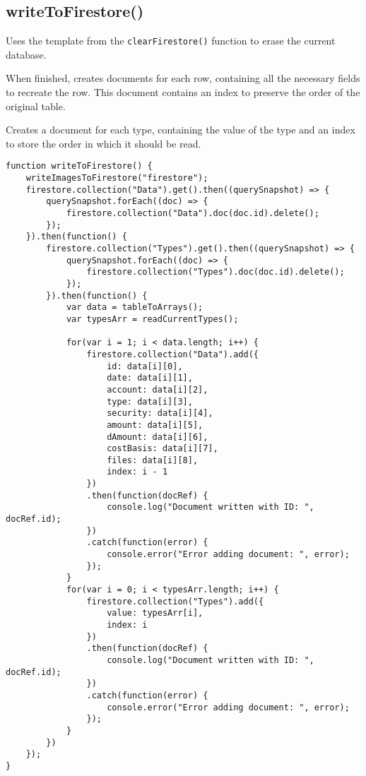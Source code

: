 \documentclass[letterpaper]{article}
\begin{document}
\subsection{writeToFirestore()}

Uses the template from the \lstinline{clearFirestore()} function to erase the current database.

When finished, creates documents for each row, containing all the necessary fields to recreate the row.
This document contains an index to preserve the order of the original table.

Creates a document for each type, containing the value of the type and an index to store the order in which it should be read.

\begin{lstlisting}[firstnumber=76]
function writeToFirestore() {
    writeImagesToFirestore("firestore");
    firestore.collection("Data").get().then((querySnapshot) => {
        querySnapshot.forEach((doc) => {
            firestore.collection("Data").doc(doc.id).delete();
        });
    }).then(function() {
        firestore.collection("Types").get().then((querySnapshot) => {
            querySnapshot.forEach((doc) => {
                firestore.collection("Types").doc(doc.id).delete();
            });
        }).then(function() {
            var data = tableToArrays();
            var typesArr = readCurrentTypes();

            for(var i = 1; i < data.length; i++) {
                firestore.collection("Data").add({
                    id: data[i][0],
                    date: data[i][1],
                    account: data[i][2],
                    type: data[i][3],
                    security: data[i][4],
                    amount: data[i][5],
                    dAmount: data[i][6],
                    costBasis: data[i][7],
                    files: data[i][8],
                    index: i - 1
                })
                .then(function(docRef) {
                    console.log("Document written with ID: ", docRef.id);
                })
                .catch(function(error) {
                    console.error("Error adding document: ", error);
                });
            }
            for(var i = 0; i < typesArr.length; i++) {
                firestore.collection("Types").add({
                    value: typesArr[i],
                    index: i
                })
                .then(function(docRef) {
                    console.log("Document written with ID: ", docRef.id);
                })
                .catch(function(error) {
                    console.error("Error adding document: ", error);
                });
            }
        })
    });
}
\end{lstlisting}
\end{document}
